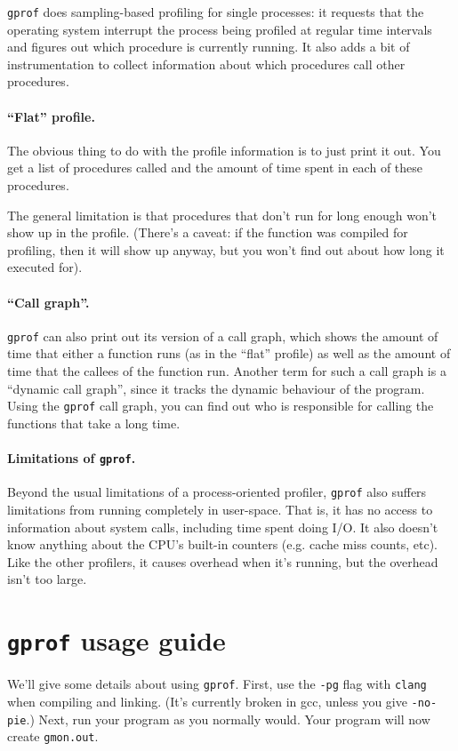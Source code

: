 {\tt gprof} does sampling-based profiling for single processes: it
requests that the operating system interrupt the process being
profiled at regular time intervals and figures out which procedure is
currently running. It also adds a bit of instrumentation to collect
information about which procedures call other procedures.

\paragraph{``Flat'' profile.} The obvious thing to do with the
profile information is to just print it out. You get a list of
procedures called and the amount of time spent in each of these 
procedures.

The general limitation is that procedures that don't run for
long enough won't show up in the profile. (There's a caveat: if
the function was compiled for profiling, then it will show up
anyway, but you won't find out about how long it executed for).

\paragraph{``Call graph''.} {\tt gprof} can also print out 
its version of a call graph, which shows the amount of time that
either a function runs (as in the ``flat'' profile) as well as the
amount of time that the callees of the function run.  Another term for
such a call graph is a ``dynamic call graph'', since it tracks the
dynamic behaviour of the program.  Using the {\tt gprof} call graph,
you can find out who is responsible for calling the functions that
take a long time.

\paragraph{Limitations of {\tt gprof}.} Beyond the usual limitations
of a process-oriented profiler, {\tt gprof} also suffers limitations
from running completely in user-space. That is, it has no access to
information about system calls, including time spent doing I/O.
It also doesn't know anything about the CPU's built-in counters
(e.g. cache miss counts, etc). Like the other profilers, it causes
overhead when it's running, but the overhead isn't too large.

\section*{{\tt gprof} usage guide}
We'll give some details about using {\tt gprof}. First,
use the {\tt -pg} flag with {\tt clang} when compiling and linking.
(It's currently broken in gcc, unless you give {\tt -no-pie}.)
Next, run your program as you normally would.
 Your program will now create {\tt gmon.out}.

